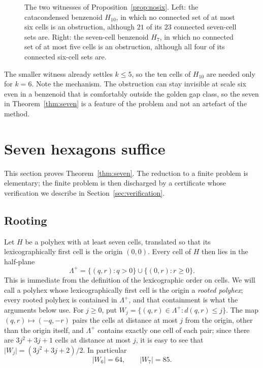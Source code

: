 \documentclass[11pt]{article}
\newcommand\abs[1]{\lvert #1\rvert}
\theoremstyle{definition}
\begin{document}
\begin{figure}[ht]
\caption{The two witnesses of Proposition~\ref{prop:nosix}.  Left: the
catacondensed benzenoid $H_{10}$, in which no connected set of at most six
cells is an obstruction, although $21$ of its $23$ connected seven-cell sets
are.  Right: the seven-cell benzenoid $H_{7}$, in which no connected set of
at most five cells is an obstruction, although all four of its connected
six-cell sets are.}
\label{fig:witnesses}
\end{figure}

The smaller witness already settles $k\le5$, so the ten cells of $H_{10}$ are
needed only for $k=6$.  Note the mechanism.  The obstruction can stay
invisible at scale six even in a benzenoid that is comfortably outside the
golden gap class, so the seven in Theorem~\ref{thm:seven} is a feature of the
problem and not an artefact of the method.

\section{Seven hexagons suffice}\label{sec:seven}

This section proves Theorem~\ref{thm:seven}.  The reduction to a finite
problem is elementary; the finite problem is then discharged by a certificate
whose verification we describe in Section~\ref{sec:verification}.

\subsection{Rooting}\label{sec:rooting}

Let $H$ be a polyhex with at least seven cells, translated so that its
lexicographically first cell is the origin $(0,0)$.  Every cell of $H$ then
lies in the half-plane
\begin{equation}\label{eq:halfplane}
 \Lambda^{+}=\{(q,r):q>0\}\cup\{(0,r):r\ge0\} .
\end{equation}
This is immediate from the definition of the lexicographic order on cells.
We will call a polyhex whose lexicographically first cell is the origin a
\textsl{rooted polyhex}; every rooted polyhex is contained in $\Lambda^{+}$,
and that containment is what the arguments below use.
For $j\ge0$, put $W_j=\{(q,r)\in\Lambda^{+}:d(q,r)\le j\}$.  The map
$(q,r)\mapsto(-q,-r)$ pairs the cells at distance at most $j$ from the
origin, other than the origin itself, and $\Lambda^{+}$ contains exactly one cell
of each pair; since there are $3j^2+3j+1$ cells at distance at most $j$, it
is easy to see that $\abs{W_j}=(3j^2+3j+2)/2$.  In particular
\begin{equation}\label{eq:W-counts}
 \abs{W_6}=64,\qquad\abs{W_7}=85 .
\end{equation}
\end{document}
